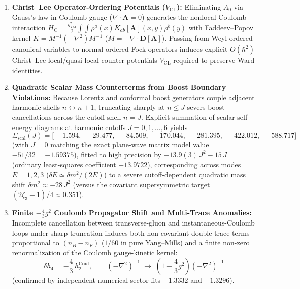 \begin{enumerate}[leftmargin=2em]
  \item \textbf{Christ--Lee Operator-Ordering Potentials ($V_{\mathrm{CL}}$):} Eliminating $A_0$ via Gauss's law in Coulomb gauge ($\nabla\cdot\mathbf{A} = 0$) generates the nonlocal Coulomb interaction $H_{\mathrm{C}} = \frac{g_{\mathrm{YM}}^2}{2}\int\!\!\int \rho^a(x) K_{ab}[\mathbf{A}](x,y)\rho^b(y)$ with Faddeev--Popov kernel $K = M^{-1}(-\nabla^2)M^{-1}$ ($M = -\nabla\cdot\mathbf{D}[\mathbf{A}]$). Passing from Weyl-ordered canonical variables to normal-ordered Fock operators induces explicit $O(\hbar^2)$ Christ--Lee local/quasi-local counter-potentials $V_{\mathrm{CL}}$ required to preserve Ward identities.
  \item \textbf{Quadratic Scalar Mass Counterterms from Boost Boundary Violations:} Because Lorentz and conformal boost generators couple adjacent harmonic shells $n \leftrightarrow n+1$, truncating sharply at $n \le J$ severs boost cancellations across the cutoff shell $n = J$. Explicit summation of scalar self-energy diagrams at harmonic cutoffs $J = 0, 1, \dots, 6$ yields
  \[
  \Sigma_{\mathrm{scal}}(J) = \bigl[-1.594,\;-29.477,\;-84.509,\;-170.044,\;-281.395,\;-422.012,\;-588.717\bigr]
  \]
  (with $J=0$ matching the exact plane-wave matrix model value $-51/32 = -1.59375$), fitted to high precision by $-13.9(3)\,J^2 - 15\,J$ (ordinary least-squares coefficient $-13.9722$), corresponding across modes $E = 1, 2, 3$ ($\delta E \simeq \delta m^2/(2E)$) to a severe cutoff-dependent quadratic mass shift $\delta m^2 \approx -28\,J^2$ (versus the covariant supersymmetric target $(2\zeta_3 - 1)/4 \approx 0.351$).
  \item \textbf{Finite $-\frac{4}{3}g^2$ Coulomb Propagator Shift and Multi-Trace Anomalies:} Incomplete cancellation between transverse-gluon and instantaneous-Coulomb loops under sharp truncation induces both non-covariant double-trace terms proportional to $(n_B - n_F)$ ($1/60$ in pure Yang--Mills) and a finite non-zero renormalization of the Coulomb gauge-kinetic kernel:
  \begin{equation}
  \delta h_4 = -\frac{4}{3}\,h_2^{\mathrm{Coul}},
  \qquad
  (-\nabla^2)^{-1} \;\longrightarrow\; \left(1 - \frac{4}{3}g^2\right)(-\nabla^2)^{-1}
  \label{eq:coulomb_4_3_anomaly}
  \end{equation}
  (confirmed by independent numerical sector fits $-1.3332$ and $-1.3296$).
\end{enumerate}

